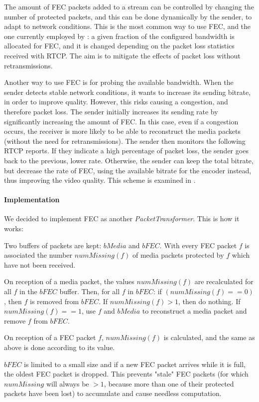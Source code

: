 \documentclass[twoside,openright,a4paper,12pt,english]{article}
\begin{document}
The amount of FEC packets added to a stream can be controlled by changing the
number of protected packets, and this can be done dynamically by the sender, to
adapt to network conditions. This is the most common way to use FEC, and the
one currently employed by \wrtc: a given fraction of the configured bandwidth
is allocated for FEC, and it is changed depending on the packet loss
statistics received with RTCP. The aim is to mitigate the effects of packet
loss without retransmissions. 

Another way to use FEC is for probing the available bandwidth. When the sender
detects stable network conditions, it wants to increase its sending bitrate, in
order to improve quality. However, this risks causing a congestion, and therefore
packet loss. The sender initially increases its sending rate by significantly
increasing the amount of FEC. In this case, even if a congestion occurs, the receiver
is more likely to be able to reconstruct the media packets (without the need for
retransmissions). The sender then monitors the following RTCP reports. If they
indicate a high percentage of packet loss, the sender goes back to the
previous, lower rate. Otherwise, the sender can keep the total bitrate, but decrease
the rate of FEC, using the available bitrate for the encoder instead, thus improving
the video quality. This scheme is examined in \cite{NagySOE13}.


\paragraph*{Implementation}
We decided to implement FEC as another \emph{PacketTransformer}. This is how it works:

Two buffers of packets are kept: $bMedia$ and $bFEC$. With every FEC packet $f$
is associated the number $numMissing(f)$ of media packets protected by $f$
which have not been received.

On reception of a media packet, the values $numMissing(f)$ are recalculated for
all $f$ in the $bFEC$ buffer. Then, for all $f$ in $bFEC$: if $(numMissing(f)
== 0)$, then $f$ is removed from $bFEC$. If $numMissing(f) > 1$, then do
nothing. If $numMissing(f) == 1$, use $f$ and $bMedia$ to reconstruct a media
packet and remove $f$ from $bFEC$.

On reception of a FEC packet $f$, $numMissing(f)$ is calculated, and the same
as above is done according to its value.

$bFEC$ is limited to a small size and if a new FEC packet arrives while it is
full, the oldest FEC packet is dropped. This prevents "stale" FEC packets (for
which $numMissing$ will always be $>1$, because more than one of their
protected packets have been lost) to accumulate and cause needless computation.
\end{document}

